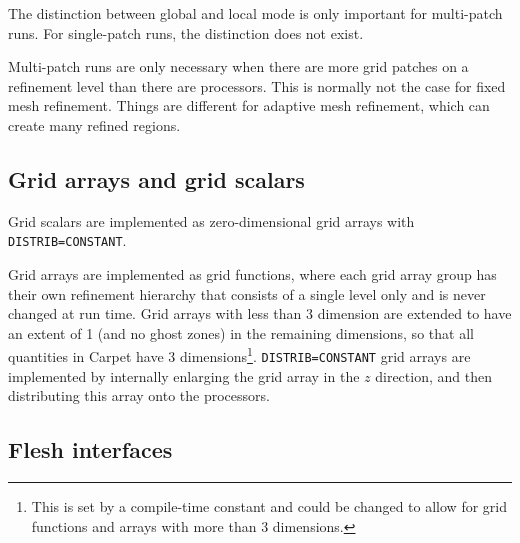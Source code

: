 \documentclass{article}
\begin{document}
   The distinction between global and local mode is only important for
   multi-patch runs.  For single-patch runs, the distinction does not
   exist.

   Multi-patch runs are only necessary when there are more grid
   patches on a refinement level than there are processors.  This is
   normally not the case for fixed mesh refinement.  Things are
   different for adaptive mesh refinement, which can create many
   refined regions.



\subsection{Grid arrays and grid scalars}

   Grid scalars are implemented as zero-dimensional grid arrays with
   \texttt{DISTRIB=CONSTANT}.

   Grid arrays are implemented as grid functions, where each grid
   array group has their own refinement hierarchy that consists of a
   single level only and is never changed at run time.  Grid arrays
   with less than 3 dimension are extended to have an extent of 1 (and
   no ghost zones) in the remaining dimensions, so that all quantities
   in Carpet have 3 dimensions\footnote{This is set by a compile-time
   constant and could be changed to allow for grid functions and
   arrays with more than 3 dimensions.}.  \texttt{DISTRIB=CONSTANT} grid arrays
   are implemented by internally enlarging the grid array in the $z$
   direction, and then distributing this array onto the processors.



\subsection{Flesh interfaces}
\end{document}
